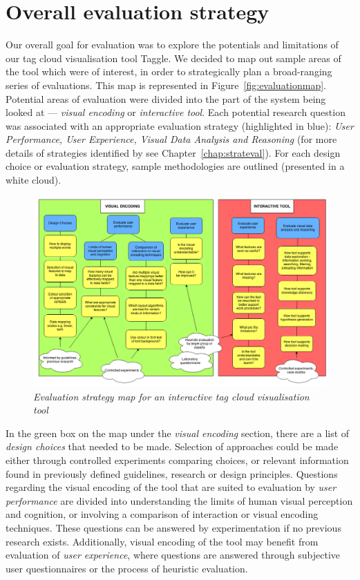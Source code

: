 \section{Overall evaluation strategy}\label{sect:evalstrat}

Our overall goal for evaluation was to explore the potentials and limitations of our tag cloud visualisation tool Taggle. We decided to map out sample areas of the tool which were of interest, in order to strategically plan a broad-ranging series of evaluations. This map is represented in Figure~\vref{fig:evaluationmap}. Potential areas of evaluation were divided into the part of the system being looked at --- \emph{visual encoding} or \emph{interactive tool}. Each potential research question was associated with an appropriate evaluation strategy (highlighted in blue): \emph{User Performance, User Experience, Visual Data Analysis and Reasoning} (for more details of strategies identified by \citet{lam12} see Chapter~\ref{chap:strateval}). For each design choice or evaluation strategy, sample methodologies are outlined (presented in a white cloud).

\begin{landscape} %
\begin{figure}[!htb]
   	\centering
  	\includegraphics[scale=0.6]{TaggleEvaluation.png}	
	\caption{\textit{Evaluation strategy map for an interactive tag cloud visualisation tool}}
	\label{fig:evaluationmap}
\end{figure}
\end{landscape}

In the green box on the map under the \emph{visual encoding} section, there are a list of \emph{design choices} that needed to be made. Selection of approaches could be made either through controlled experiments comparing choices, or relevant information found in previously defined guidelines, research or design principles. Questions regarding the visual encoding of the tool that are suited to evaluation by \emph{user performance} are divided into understanding the limits of human visual perception and cognition, or involving a comparison of interaction or visual encoding techniques. These questions can be answered by experimentation if no previous research exists. Additionally, visual encoding of the tool may benefit from evaluation of \emph{user experience}, where questions are answered through subjective user questionnaires or the process of heuristic evaluation.

